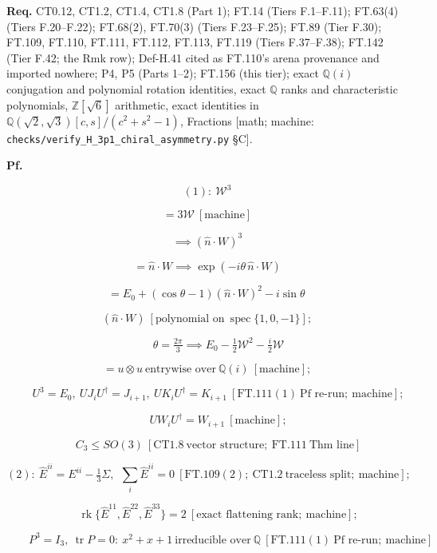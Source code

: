 \begin{theorem}
\textbf{Req.} CT0.12, CT1.2, CT1.4, CT1.8 (Part 1); FT.14 (Tiers F.1–F.11); FT.63(4) (Tiers F.20–F.22); FT.68(2), FT.70(3) (Tiers F.23–F.25); FT.89 (Tier F.30); FT.109, FT.110, FT.111, FT.112, FT.113, FT.119 (Tiers F.37–F.38); FT.142 (Tier F.42; the Rmk row); Def-H.41 cited as FT.110's arena provenance and imported nowhere; P4, P5 (Parts 1–2); FT.156 (this tier); exact $\mathbb Q(i)$ conjugation and polynomial rotation identities, exact $\mathbb Q$ ranks and characteristic polynomials, $\mathbb Z[\sqrt6]$ arithmetic, exact identities in $\mathbb Q(\sqrt2,\sqrt3)[c,s]/(c^2{+}s^2{-}1)$, Fractions [math; machine: \texttt{checks/\allowbreak{}verify\_\allowbreak{}H\_\allowbreak{}3p1\_\allowbreak{}chiral\_\allowbreak{}asymmetry.py} §C].

\textbf{Pf.}

\[
(1):\ \mathcal W^3
\]

\[
= 3\mathcal W\ [\text{machine}]
\]

\[
\implies (\hat n\cdot W)^3
\]

\[
= \hat n\cdot W\implies\exp(-i\theta\,\hat n\cdot W)
\]

\[
= E_0+(\cos\theta-1)(\hat n\cdot W)^2-i\sin\theta\,
\]

\[
(\hat n\cdot W)\ [\text{polynomial on}\ \operatorname{spec}\{1,0,-1\}];
\]

\[
\qquad \theta=\tfrac{2\pi}3\implies E_0-\tfrac12\mathcal W^2-\tfrac i2\mathcal W
\]

\[
=u\otimes u\ \text{entrywise over}\ \mathbb Q(i)\ [\text{machine}];
\]

\[
\qquad U^3=E_0,\ UJ_iU^\dagger=J_{i+1},\ UK_iU^\dagger=K_{i+1}\ [\mathrm{FT.111}(1)\ \text{Pf re-run};\ \text{machine}];
\]

\[
\qquad UW_iU^\dagger=W_{i+1}\ [\text{machine}];
\]

\[
\qquad C_3\le SO(3)\ [\mathrm{CT1.8}\ \text{vector structure};\ \mathrm{FT.111}\ \text{Thm line}]
\]

\[
(2):\ \hat E^{ii}=E^{ii}-\tfrac13\Sigma,\ \ \textstyle\sum_i\hat E^{ii}=0\ [\mathrm{FT.109}(2);\ \mathrm{CT1.2}\ \text{traceless split};\ \text{machine}];
\]

\[
\qquad \operatorname{rk}\{\hat E^{11},\hat E^{22},\hat E^{33}\}=2\ [\text{exact flattening rank};\ \text{machine}];
\]

\[
\qquad P^3=I_3,\ \operatorname{tr}P=0:\ x^2+x+1\ \text{irreducible over}\ \mathbb Q\ [\mathrm{FT.111}(1)\ \text{Pf re-run};\ \text{machine}]
\]


\end{theorem}
